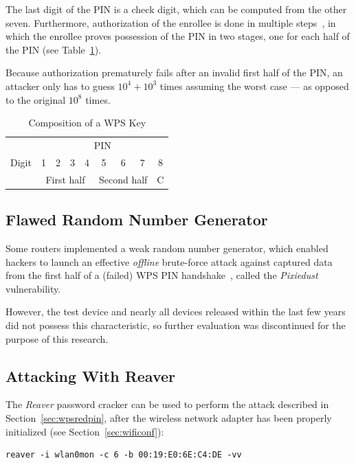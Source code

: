 The last digit of the PIN is a check digit, which can be computed from the other seven. Furthermore, authorization of the enrollee is done in multiple steps~\cite{WiFi06}, in which the enrollee proves possession of the PIN in two stages, one for each half of the PIN (see Table~\ref{tbl:wpskey}).

Because authorization prematurely fails after an invalid first half of the PIN, an attacker only has to guess \(10^4 + 10^3\) times assuming the worst case --- as opposed to the original \(10^8\) times.

\begin{table}[]
\centering
\caption{Composition of a WPS Key}\label{tbl:wpskey}
\begin{tabular}{l|c|c|c|c|c|c|c|l|}
\cline{2-9}
 & \multicolumn{8}{c|}{PIN} \\ \cline{2-9} 
Digit & 1 & 2 & 3 & 4 & 5 & 6 & 7 & \multicolumn{1}{c|}{8} \\ \cline{2-9} 
 & \multicolumn{4}{c|}{First half} & \multicolumn{3}{c|}{Second half} & C \\ \cline{2-9} 
\end{tabular}
\end{table}

\subsection{Flawed Random Number Generator}\label{sec:pixiedust}

Some routers implemented a weak random number generator, which enabled hackers to launch an effective \emph{offline} brute-force attack against captured data from the first half of a (failed) WPS PIN handshake~\cite{Bongard14}, called the \emph{Pixiedust} vulnerability.

However, the test device and nearly all devices released within the last few years did not possess this characteristic, so further evaluation was discontinued for the purpose of this research.

\subsection{Attacking With Reaver}\label{sec:reaver}

The \emph{Reaver} password cracker can be used to perform the attack described in Section~\ref{sec:wpsredpin}, after the wireless network adapter has been properly initialized (see Section~\ref{sec:wificonf}):

\begin{lstlisting}
reaver -i wlan0mon -c 6 -b 00:19:E0:6E:C4:DE -vv
\end{lstlisting}

